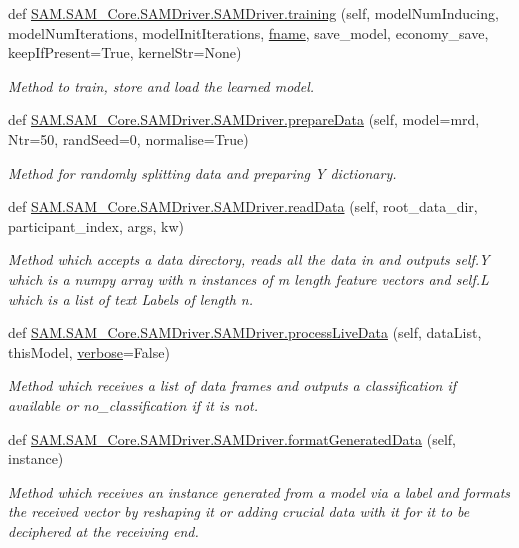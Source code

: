 \begin{DoxyCompactItemize}
def \hyperlink{group__icubclient__SAM__Drivers_ga35c70890b650a03a8da39b87c1de39d7}{S\+A\+M.\+S\+A\+M\+\_\+\+Core.\+S\+A\+M\+Driver.\+S\+A\+M\+Driver.\+training} (self, model\+Num\+Inducing, model\+Num\+Iterations, model\+Init\+Iterations, \hyperlink{group__icubclient__SAM__Drivers_ga1095171ae626372dde87a71f9d9263ce}{fname}, save\+\_\+model, economy\+\_\+save, keep\+If\+Present=True, kernel\+Str=None)
\begin{DoxyCompactList}\small\item\em Method to train, store and load the learned model. \end{DoxyCompactList}\item 
def \hyperlink{group__icubclient__SAM__Drivers_ga9e09b2b15fd19eeceef3345c55ffdbdb}{S\+A\+M.\+S\+A\+M\+\_\+\+Core.\+S\+A\+M\+Driver.\+S\+A\+M\+Driver.\+prepare\+Data} (self, model=\textquotesingle{}mrd\textquotesingle{}, Ntr=50, rand\+Seed=0, normalise=True)
\begin{DoxyCompactList}\small\item\em Method for randomly splitting data and preparing Y dictionary. \end{DoxyCompactList}\item 
def \hyperlink{group__icubclient__SAM__Drivers_ga7a55565b0b0f58639327877c4f9cced0}{S\+A\+M.\+S\+A\+M\+\_\+\+Core.\+S\+A\+M\+Driver.\+S\+A\+M\+Driver.\+read\+Data} (self, root\+\_\+data\+\_\+dir, participant\+\_\+index, args, kw)
\begin{DoxyCompactList}\small\item\em Method which accepts a data directory, reads all the data in and outputs self.\+Y which is a numpy array with n instances of m length feature vectors and self.\+L which is a list of text Labels of length n. \end{DoxyCompactList}\item 
def \hyperlink{group__icubclient__SAM__Drivers_gab82c8e473429a812d61a6685428dfc72}{S\+A\+M.\+S\+A\+M\+\_\+\+Core.\+S\+A\+M\+Driver.\+S\+A\+M\+Driver.\+process\+Live\+Data} (self, data\+List, this\+Model, \hyperlink{group__icubclient__SAM__Drivers_ga48cfefc6532ba606936b9fd7f3156da8}{verbose}=False)
\begin{DoxyCompactList}\small\item\em Method which receives a list of data frames and outputs a classification if available or \textquotesingle{}no\+\_\+classification\textquotesingle{} if it is not. \end{DoxyCompactList}\item 
def \hyperlink{group__icubclient__SAM__Drivers_gaac21747b09e36216d09a23bd726cf62d}{S\+A\+M.\+S\+A\+M\+\_\+\+Core.\+S\+A\+M\+Driver.\+S\+A\+M\+Driver.\+format\+Generated\+Data} (self, instance)
\begin{DoxyCompactList}\small\item\em Method which receives an instance generated from a model via a label and formats the received vector by reshaping it or adding crucial data with it for it to be deciphered at the receiving end. \end{DoxyCompactList}\end{DoxyCompactItemize}
